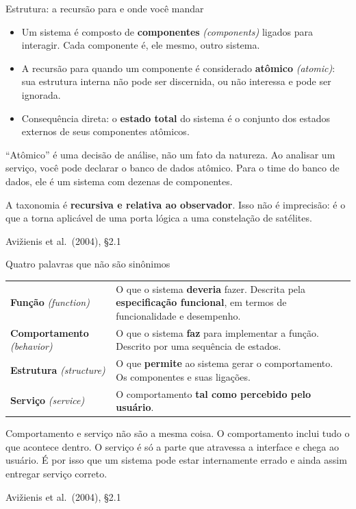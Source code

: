 \documentclass{beamer}
\newcommand{\en}[1]{{\color{depCinza}\textit{#1}}}
\newcommand{\sect}[1]{\par\smallskip\hfill{\tiny\color{black!55}Avi\v{z}ienis et al.\ (2004), #1}}
\begin{document}
\begin{frame}{Estrutura: a recurs\~ao para e onde voc\^e mandar}
    \footnotesize
    \begin{itemize}
        \item Um sistema \'e composto de \textbf{componentes} \en{(components)} ligados para interagir. Cada componente \'e, ele mesmo, outro sistema.
        \item A recurs\~ao para quando um componente \'e considerado \textbf{at\^omico} \en{(atomic)}: sua estrutura interna n\~ao pode ser discernida, ou n\~ao interessa e pode ser ignorada.
        \item Consequ\^encia direta: o \textbf{estado total} do sistema \'e o conjunto dos estados externos de seus componentes at\^omicos.
    \end{itemize}
    \medskip
    \begin{pratica}
        \scriptsize
        ``At\^omico'' \'e uma decis\~ao de an\'alise, n\~ao um fato da natureza. Ao analisar um servi\c{c}o, voc\^e pode declarar o banco de dados at\^omico. Para o time do banco de dados, ele \'e um sistema com dezenas de componentes.
    \end{pratica}
    \medskip
    \begin{ancora}
        \footnotesize
        A taxonomia \'e \textbf{recursiva e relativa ao observador}. Isso n\~ao \'e imprecis\~ao: \'e o que a torna aplic\'avel de uma porta l\'ogica a uma constela\c{c}\~ao de sat\'elites.
    \end{ancora}
    \sect{\S2.1}
\end{frame}

\begin{frame}{Quatro palavras que n\~ao s\~ao sin\^onimos}
    \footnotesize
    \begin{tabularx}{\linewidth}{@{}p{2.5cm} >{\raggedright\arraybackslash}X@{}}
        \toprule
        \textbf{Fun\c{c}\~ao} \en{(function)} & O que o sistema \textbf{deveria} fazer. Descrita pela \textbf{especifica\c{c}\~ao funcional}, em termos de funcionalidade e desempenho. \\
        \addlinespace
        \textbf{Comportamento} \en{(behavior)} & O que o sistema \textbf{faz} para implementar a fun\c{c}\~ao. Descrito por uma sequ\^encia de estados. \\
        \addlinespace
        \textbf{Estrutura} \en{(structure)} & O que \textbf{permite} ao sistema gerar o comportamento. Os componentes e suas liga\c{c}\~oes. \\
        \addlinespace
        \textbf{Servi\c{c}o} \en{(service)} & O comportamento \textbf{tal como percebido pelo usu\'ario}. \\
        \bottomrule
    \end{tabularx}
    \medskip
    \begin{armadilha}
        \scriptsize
        Comportamento e servi\c{c}o n\~ao s\~ao a mesma coisa. O comportamento inclui tudo o que acontece dentro. O servi\c{c}o \'e s\'o a parte que atravessa a interface e chega ao usu\'ario. \'E por isso que um sistema pode estar internamente errado e ainda assim entregar servi\c{c}o correto.
    \end{armadilha}
    \sect{\S2.1}
\end{frame}
\end{document}
